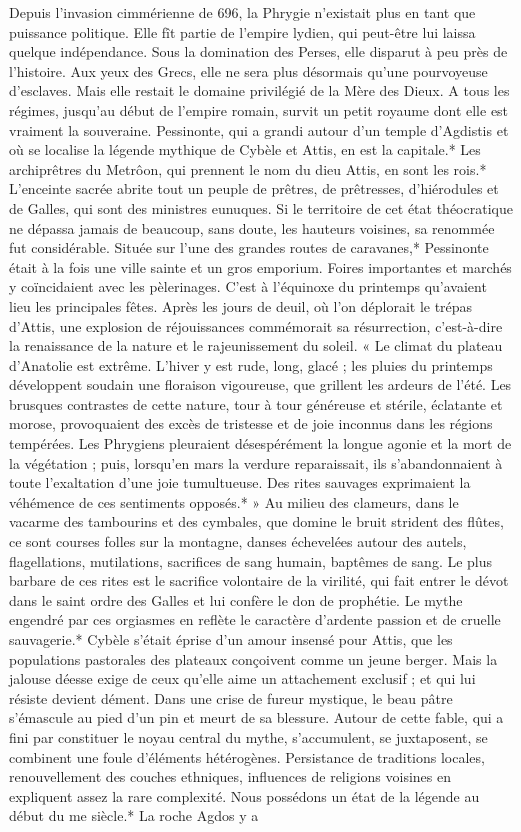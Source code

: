 \documentclass[a4paper, 11pt, oneside, polutonikogreek, french]{article}
\begin{document}
Depuis l'invasion cimmérienne de 696, la Phrygie n'existait plus en tant que puissance politique. Elle fît partie de l'empire lydien, qui peut-être lui laissa quelque indépendance. Sous la domination des Perses, elle disparut à peu près de l'histoire. Aux yeux des Grecs, elle ne sera plus désormais qu'une pourvoyeuse d'esclaves. Mais elle restait le domaine privilégié de la Mère des Dieux. A tous les régimes, jusqu'au début de l'empire romain, survit un petit royaume dont elle est vraiment la souveraine. Pessinonte, qui a grandi autour d'un temple d'Agdistis et où se localise la légende mythique de Cybèle et Attis, en est la capitale.* Les archiprêtres du Metrôon, qui prennent le nom du dieu Attis, en sont les rois.* L'enceinte sacrée abrite tout un peuple de prêtres, de prêtresses, d'hiérodules et de Galles, qui sont des ministres eunuques. Si le territoire de cet état théocratique ne dépassa jamais de beaucoup, sans doute, les hauteurs voisines, sa renommée fut considérable. Située sur l'une des grandes routes de caravanes,* Pessinonte était à la fois une ville sainte et un gros emporium. Foires importantes et marchés y coïncidaient avec les pèlerinages. C'est à l'équinoxe du printemps qu'avaient lieu les principales fêtes. Après les jours de deuil, où l'on déplorait le trépas d'Attis, une explosion de réjouissances commémorait sa résurrection, c'est-à-dire la renaissance de la nature et le rajeunissement du soleil. « Le climat du plateau d'Anatolie est extrême. L'hiver y est rude, long, glacé ; les pluies du printemps développent soudain une floraison vigoureuse, que grillent les ardeurs de l'été. Les brusques contrastes de cette nature, tour à tour généreuse et stérile, éclatante et morose, provoquaient des excès de tristesse et de joie inconnus dans les régions tempérées. Les Phrygiens pleuraient désespérément la longue agonie et la mort de la végétation ; puis, lorsqu'en mars la verdure reparaissait, ils s'abandonnaient à toute l'exaltation d'une joie tumultueuse. Des rites sauvages exprimaient la véhémence de ces sentiments opposés.* » Au milieu des clameurs, dans le vacarme des tambourins et des cymbales, que domine le bruit strident des flûtes, ce sont courses folles sur la montagne, danses échevelées autour des autels, flagellations, mutilations, sacrifices de sang humain, baptêmes de sang. Le plus barbare de ces rites est le sacrifice volontaire de la virilité, qui fait entrer le dévot dans le saint ordre des Galles et lui confère le don de prophétie. Le mythe engendré par ces orgiasmes en reflète le caractère d'ardente passion et de cruelle sauvagerie.* Cybèle s'était éprise d'un amour insensé pour Attis, que les populations pastorales des plateaux conçoivent comme un jeune berger. Mais la jalouse déesse exige de ceux qu'elle aime un attachement exclusif ; et qui lui résiste devient dément. Dans une crise de fureur mystique, le beau pâtre s'émascule au pied d'un pin et meurt de sa blessure. Autour de cette fable, qui a fini par constituer le noyau central du mythe, s'accumulent, se juxtaposent, se combinent une foule d'éléments hétérogènes. Persistance de traditions locales, renouvellement des couches ethniques, influences de religions voisines en expliquent assez la rare complexité. Nous possédons un état de la légende au début du me siècle.* La roche Agdos y a 
\end{document}
